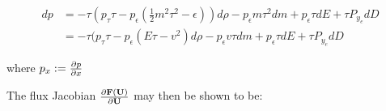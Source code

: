\documentclass[twocolumn]{aastex62}
\begin{document}
\begin{equation}
\begin{split}
  dp & = -\tau (p_\tau \tau - p_{\epsilon}(\frac{1}{2} m^2 \tau^2 - \epsilon))d\rho - p_{\epsilon}m\tau^2 dm + p_{\epsilon}\tau dE + \tau P_{y_e}dD\\
     & = -\tau (p_\tau \tau - p_{\epsilon}(E\tau-v^2)d\rho -p_{\epsilon}v\tau dm + p_{\epsilon}\tau dE + \tau P_{y_e}dD
\end{split}
\end{equation}

where $p_{x} := \frac{\partial p}{\partial x}$


The flux Jacobian $\frac{\partial \mathbf{F}(\mathbf{U})}{\partial \mathbf{U}}$ may then be shown to be:

%
%
%
%
%
%
\end{document}
